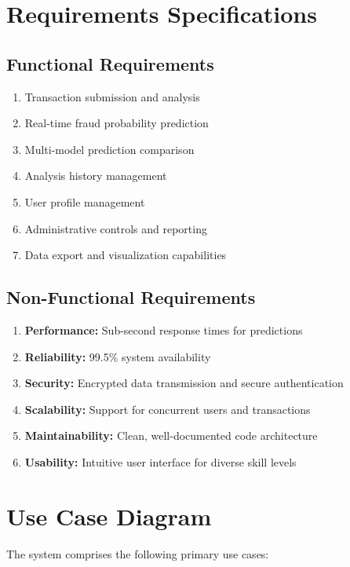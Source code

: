 \documentclass[12pt,a4paper,twoside]{report}
\begin{document}
\section{Requirements Specifications}

\subsection{Functional Requirements}

\begin{enumerate}
    \item Transaction submission and analysis
    \item Real-time fraud probability prediction
    \item Multi-model prediction comparison
    \item Analysis history management
    \item User profile management
    \item Administrative controls and reporting
    \item Data export and visualization capabilities
\end{enumerate}

\subsection{Non-Functional Requirements}

\begin{enumerate}
    \item \textbf{Performance:} Sub-second response times for predictions
    \item \textbf{Reliability:} 99.5\% system availability
    \item \textbf{Security:} Encrypted data transmission and secure authentication
    \item \textbf{Scalability:} Support for concurrent users and transactions
    \item \textbf{Maintainability:} Clean, well-documented code architecture
    \item \textbf{Usability:} Intuitive user interface for diverse skill levels
\end{enumerate}

\section{Use Case Diagram}

The system comprises the following primary use cases:
\end{document}
